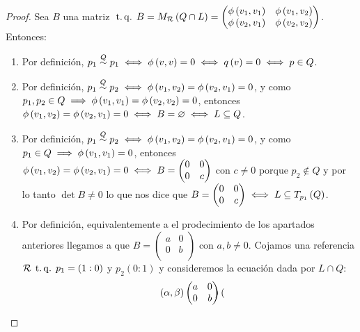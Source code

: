 \begin{proof}
  Sea $B$ una matriz $\operatorname{\;t.q.\;} B=M_{\mathcal{R}} \left( Q\cap L\right) = \begin{pmatrix}
    \phi\left( v_1,v_1\right) & \phi\left( v_1,v_2\right)\\
    \phi\left( v_2,v_1\right) & \phi\left( v_2,v_2\right)\\
  \end{pmatrix}$. Entonces:
  \begin{enumerate}[(1)]
    \item Por definición, $p_1 \stackrel{Q}{\sim} p_1 \iff \phi\left( v,v\right)=0 \iff q\left( v\right)=0 \iff p\in Q$.
    \item Por definición, $p_1 \stackrel{Q}{\sim} p_2 \iff \phi\left( v_1,v_2\right)=\phi\left( v_2,v_1\right)=0$, y como
      $p_1,p_2\in Q \implies \phi\left( v_1,v_1\right)=\phi\left( v_2,v_2\right)=0$, entonces $\phi\left( v_1,v_2\right)=
      \phi\left( v_2,v_1\right)=0 \iff B=\varnothing \iff L\subseteq Q$.
    \item Por definición, $p_1 \stackrel{Q}{\sim} p_2 \iff \phi\left( v_1,v_2\right)=\phi\left( v_2,v_1\right)=0$, y como 
      $p_1\in Q \implies \phi\left( v_1,v_1\right)=0$, entonces $\phi\left( v_1,v_2\right)=
      \phi\left( v_2,v_1\right)=0 \iff B= 
      \begin{pmatrix}
        0 & 0\\
        0 & c\\
      \end{pmatrix}$ con $c\neq 0$ porque $p_2 \not\in Q$ y por lo tanto $\det B \neq 0$ lo que nos dice que 
      $B= 
      \begin{pmatrix}
        0 & 0\\
        0 & c\\
      \end{pmatrix} \iff L\subseteq T_{p_1}\left( Q\right)$.
    \item Por definición, equivalentemente a el prodecimiento de los apartados anteriores llegamos a que $B=
      \begin{pmatrix}
        a & 0\\
        0 & b\\
      \end{pmatrix}$ con $a,b\neq 0$. Cojamos una referencia $\mathcal{R} \operatorname{\;t.q.\;} p_1=\left( 1:0\right)$ y $p_2(0:1)$ y consideremos la ecuación dada por $L\cap Q$:
      \[
        \left( \alpha,\beta\right)
        \begin{pmatrix}
          a & 0\\
          0 & b\\
        \end{pmatrix}
        \begin{pmatrix}

\end{pmatrix}\]
\end{enumerate}
\end{proof}
